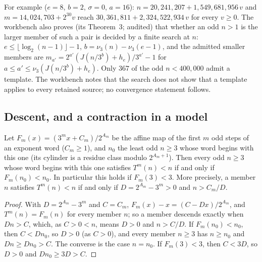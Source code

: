 For example ($e=8$, $b=2$, $\sigma=0$, $a=16$): $n=20{,}241{,}207+1{,}549{,}681{,}956\,v$ and $m=14{,}024{,}703+2^{30}v$ reach $30{,}361{,}811+2{,}324{,}522{,}934\,v$ for every $v\ge0$.
The workbench also proves (its Theorem~3; audited) that whether an odd $n>1$ is the larger member of such a pair is decided by a finite search at $n$: $e\le\lfloor\log_2(n-1)\rfloor-1$, $b=\nu_3(n)-\nu_3(e-1)$, and the admitted smaller members are $m_{a'}=2^{a'}(J(n/3^b)+h_e)/3^{a'}-1$ for $a\le a'\le\nu_3(J(n/3^b)+h_e)$. Only $367$ of the odd $n<400{,}000$ admit a template. The workbench notes that the search does not show that a template applies to every retained source; no convergence statement follows.

\subsection{Descent, and a contraction in a model}

\begin{proposition}\label{prop:ref3}
Let $F_m(x)=(3^mx+C_m)/2^{A_m}$ be the affine map of the first $m$ odd steps of an exponent word ($C_m\ge1$), and $n_0$ the least odd $n\ge3$ whose word begins with this one (its cylinder is a residue class modulo $2^{A_m+1}$). Then every odd $n\ge3$ whose word begins with this one satisfies $T^m(n)<n$ if and only if $F_m(n_0)<n_0$. In particular this holds if $F_m(3)<3$. More precisely, a member $n$ satisfies $T^m(n)<n$ if and only if $D=2^{A_m}-3^m>0$ and $n>C_m/D$.
\end{proposition}
\begin{proof}
With $D=2^{A_m}-3^m$ and $C=C_m$, $F_m(x)-x=(C-Dx)/2^{A_m}$, and $T^m(n)=F_m(n)$ for every member $n$; so a member descends exactly when $Dn>C$, which, as $C>0<n$, means $D>0$ and $n>C/D$. If $F_m(n_0)<n_0$, then $C<Dn_0$, so $D>0$ (as $C>0$), and every member $n\ge3$ has $n\ge n_0$ and $Dn\ge Dn_0>C$. The converse is the case $n=n_0$. If $F_m(3)<3$, then $C<3D$, so $D>0$ and $Dn_0\ge3D>C$.
\end{proof}

